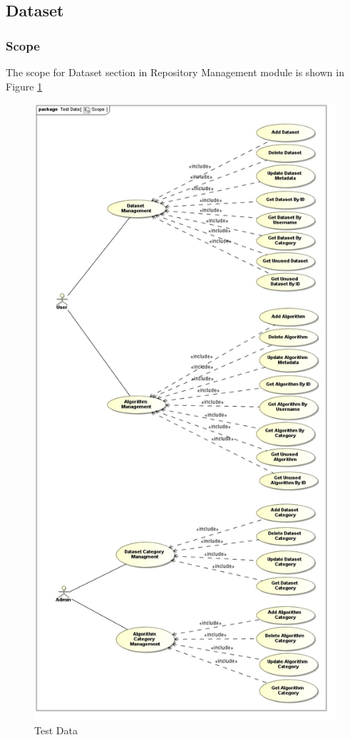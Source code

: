 \subsection{Dataset}
\subsubsection{Scope}
The scope for Dataset section in Repository Management module is shown in Figure \ref{fig:datasetRepo}
\begin{figure}[H]
  \begin{center}
  \includegraphics[scale=0.7]{../Diagrams and Charts/Test Data/Scope.jpg}
  \caption{Test Data}
  \end{center}
  \label{fig:datasetRepo}
\end{figure}
